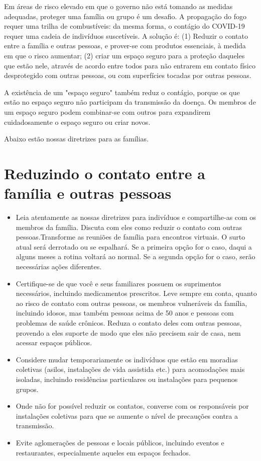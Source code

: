 \documentclass[onecolumn,journal]{IEEEtran}
\begin{document}
\begin{multicols}{2}


Em áreas de risco elevado em que o governo não está tomando as medidas adequadas, proteger uma família ou grupo é um desafio. A propagação do fogo requer uma trilha de combustíveis: da mesma forma, o contágio do COVID-19 requer uma cadeia de indivíduos suscetíveis. A solução é: (1) Reduzir o contato entre a família e outras pessoas, e prover-se com produtos essenciais, à medida em que o risco aumentar; (2) criar um espaço seguro para a proteção daqueles que estão nele, através de acordo entre todos para não entrarem em contato físico desprotegido com outras pessoas, ou com superfícies tocadas por outras pessoas.

A existência de um "espaço seguro" também reduz o contágio, porque os que estão no espaço seguro não participam da transmissão da doença. Os membros de um espaço seguro podem combinar-se com outros para expandirem cuidadosamente o espaço seguro ou criar novos. 

Abaixo estão nossas diretrizes para as famílias.


\section*{Reduzindo o contato entre a família e outras pessoas}
\begin{itemize}
\item Leia atentamente as nossas diretrizes para indivíduos e compartilhe-as com os membros da família. Discuta com eles como reduzir o contato com outras pessoas.Transforme as reuniões de família para encontros virtuais. O surto atual será derrotado ou se espalhará. Se a primeira opção for o caso, daqui a alguns meses a rotina voltará ao normal. Se a segunda opção for o caso, serão necessárias ações diferentes.
\item Certifique-se de que você e seus familiares possuem os suprimentos necessários, incluindo medicamentos prescritos. Leve sempre em conta, quanto ao risco de contato com outras pessoas, os membros vulneráveis da família, incluindo idosos, mas também pessoas acima de 50 anos e pessoas com problemas de saúde crônicos. Reduza o contato deles com outras pessoas, provendo a eles suporte de modo que eles não precisem sair de casa, nem acessar espaços públicos.
\item Considere mudar temporariamente os indivíduos que estão em moradias coletivas (asilos, instalações de vida assistida etc.) para acomodações mais isoladas, incluindo residências particulares ou instalações para pequenos grupos.
\item Onde não for possível reduzir os contatos, converse com os responsáveis por instalações coletivas para que se aumente o nível de precauções contra a transmissão.
\item Evite aglomerações de pessoas e locais públicos, incluindo eventos e restaurantes, especialmente aqueles em espaços fechados.
\end{itemize}



\end{multicols}
\end{document}
